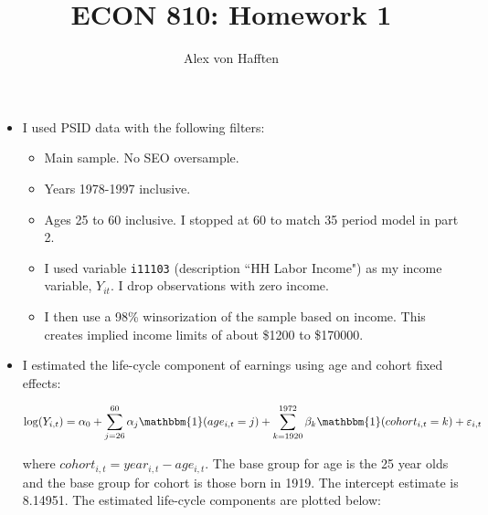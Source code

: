 \documentclass{article}
\title{ECON 810: Homework 1}
\author{Alex von Hafften }
\newcommand{\one}{\mathbbm{1}}
\begin{document}
\maketitle

\begin{itemize}

\section{Part 1: Data}

\item I used PSID data with the following filters:

\begin{itemize}

\item Main sample. No SEO oversample.

\item Years 1978-1997 inclusive.

\item Ages 25 to 60 inclusive.  I stopped at 60 to match 35 period model in part 2.

\item I used variable \texttt{i11103} (description ``HH Labor Income") as my income variable, $Y_{it}$. I drop observations with zero income.

\item I then use a 98\% winsorization of the sample based on income. This creates implied income limits of about \$1200 to \$170000.


\end{itemize} 

\item I estimated the life-cycle component of earnings using age and cohort fixed effects:

$$
\log(Y_{i,t}) = \alpha_{0} + \sum_{j = 26}^{60}\alpha_{j} \one(age_{i,t} = j) + \sum_{k = 1920}^{1972}\beta_{k} \one(cohort_{i,t} = k) + \varepsilon_{i,t}
$$

where $cohort_{i,t} = year_{i,t} - age_{i,t}$. The base group for age is the 25 year olds and the base group for cohort is those born in 1919.  The intercept estimate is 8.14951. The estimated life-cycle components are plotted below:


\end{itemize}
\end{document}
